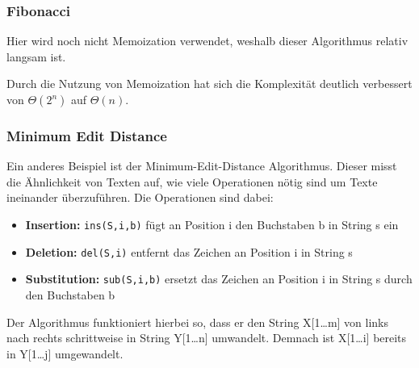 \documentclass[
../AuD-Zusammenfassung.tex,
]
{subfiles}
\begin{document}
\subsubsection{Fibonacci}
\begin{algorithm}[H]
\end{algorithm}
Hier wird noch nicht Memoization verwendet, weshalb dieser Algorithmus relativ langsam ist.\\
\begin{algorithm}[H]
\end{algorithm}
Durch die Nutzung von Memoization hat sich die Komplexität deutlich verbessert von $\Theta(2^n)$ auf $\Theta(n)$.
\newpage
\subsubsection{Minimum Edit Distance}
Ein anderes Beispiel ist der Minimum-Edit-Distance Algorithmus. Dieser misst die Ähnlichkeit von Texten auf, wie viele Operationen nötig sind um Texte ineinander überzuführen. Die Operationen sind dabei:
\begin{itemize}
    \item \textbf{Insertion:} \texttt{ins(S,i,b)} fügt an Position i den Buchstaben b in String s ein
    \item \textbf{Deletion:} \texttt{del(S,i)} entfernt das Zeichen an Position i in String s
    \item \textbf{Substitution:} \texttt{sub(S,i,b)} ersetzt das Zeichen an Position i in String s durch den Buchstaben b
\end{itemize}
Der Algorithmus funktioniert hierbei so, dass er den String X[1\dots m] von links nach rechts schrittweise in String Y[1\dots n] umwandelt. Demnach ist X[1\dots i] bereits in Y[1\dots j] umgewandelt.
\end{document}
